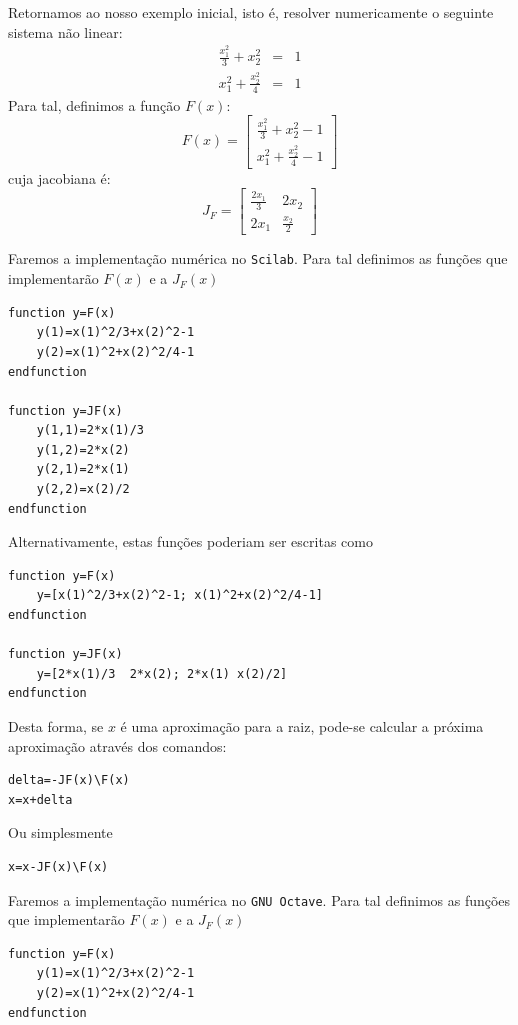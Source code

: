 \begin{ex} Retornamos ao nosso exemplo inicial, isto é, resolver numericamente o seguinte sistema não linear:
\begin{eqnarray*}
\frac{x_1^2}{3}+x_2^2&=&1\\
x_1^2+\frac{x_2^2}{4}&=&1
\end{eqnarray*}
Para tal, definimos a função $F(x)$:
\begin{equation*}
  F(x)=\left[
\begin{array}{c}
\displaystyle \frac{x_1^2}{3}+x_2^2-1\\
\displaystyle x_1^2+\frac{x_2^2}{4}-1
\end{array}
\right]
\end{equation*}
cuja jacobiana é:
\begin{equation*}
  J_F=\left[\begin{array}{cc}
      \displaystyle \frac{2x_1}{3} & 2x_2\\
      \displaystyle 2x_1&\frac{x_2}{2}
    \end{array}\right]
\end{equation*}

\ifisscilab
Faremos a implementação numérica no \verb+Scilab+. Para tal definimos as funções que implementarão $F(x)$ e a $J_F(x)$
\begin{verbatim}
function y=F(x)
    y(1)=x(1)^2/3+x(2)^2-1
    y(2)=x(1)^2+x(2)^2/4-1
endfunction

function y=JF(x)
    y(1,1)=2*x(1)/3
    y(1,2)=2*x(2)
    y(2,1)=2*x(1)
    y(2,2)=x(2)/2
endfunction
\end{verbatim}
Alternativamente, estas funções poderiam ser escritas como
\begin{verbatim}
function y=F(x)
    y=[x(1)^2/3+x(2)^2-1; x(1)^2+x(2)^2/4-1]
endfunction

function y=JF(x)
    y=[2*x(1)/3  2*x(2); 2*x(1) x(2)/2]
endfunction
\end{verbatim}
Desta forma, se $x$ é uma aproximação para a raiz, pode-se calcular a próxima aproximação através dos comandos:
\begin{verbatim}
delta=-JF(x)\F(x)
x=x+delta
\end{verbatim}
Ou simplesmente
\begin{verbatim}
x=x-JF(x)\F(x)
\end{verbatim}
\fi
\ifisoctave
Faremos a implementação numérica no \verb+GNU Octave+. Para tal definimos as funções que implementarão $F(x)$ e a $J_F(x)$
\begin{verbatim}
function y=F(x)
    y(1)=x(1)^2/3+x(2)^2-1
    y(2)=x(1)^2+x(2)^2/4-1
endfunction


\end{verbatim}
\end{ex}
